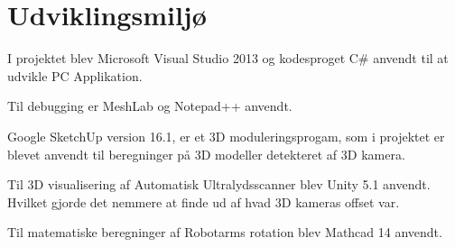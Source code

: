 \chapter{Udviklingsmiljø}\label{Udviklingsvarktojer}

I projektet blev Microsoft Visual Studio 2013 og kodesproget C\# anvendt til at udvikle PC Applikation. 
 
Til debugging er MeshLab og Notepad++ anvendt. 

Google SketchUp version 16.1, er et 3D moduleringsprogam, som i projektet er blevet anvendt til beregninger på 3D modeller detekteret af 3D kamera. 

Til 3D visualisering af Automatisk Ultralydsscanner blev Unity 5.1 anvendt. Hvilket gjorde det nemmere at finde ud af hvad 3D kameras offset var. 

Til matematiske beregninger af Robotarms rotation blev Mathcad 14 anvendt.